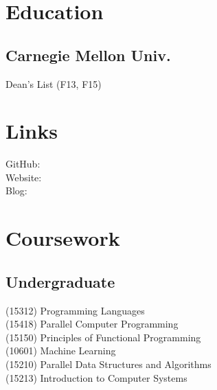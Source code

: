 \documentclass[]{deedy-resume-openfont}
\begin{document}
%
%

%
%



%
%

\begin{minipage}[t]{0.33\textwidth}


\section{Education}

\subsection{Carnegie Mellon Univ.}
Dean's List (F13, F15) \\
\sectionsep


\section{Links}
GitHub: \href{https://github.com/jez}{} \\
Website:  \href{https://jez.io}{} \\
Blog:  \href{http://blog.jez.io}{} \\
\sectionsep


\section{Coursework}
\subsection{Undergraduate}
(15312) Programming Languages\\
(15418) Parallel Computer Programming\\
(15150) Principles of Functional Programming\\
(10601) Machine Learning\\
(15210) Parallel Data Structures and Algorithms\\
(15213) Introduction to Computer Systems\\
\sectionsep


\end{minipage}
\end{document}
